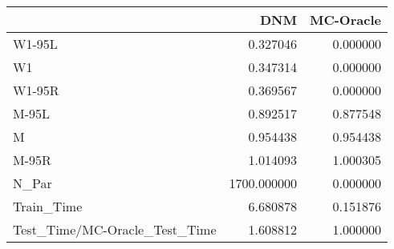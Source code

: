 \begin{tabular}{lrr}
\toprule
{} &          DNM &  MC-Oracle \\
\midrule
W1-95L                        &     0.327046 &   0.000000 \\
W1                            &     0.347314 &   0.000000 \\
W1-95R                        &     0.369567 &   0.000000 \\
M-95L                         &     0.892517 &   0.877548 \\
M                             &     0.954438 &   0.954438 \\
M-95R                         &     1.014093 &   1.000305 \\
N\_Par                         &  1700.000000 &   0.000000 \\
Train\_Time                    &     6.680878 &   0.151876 \\
Test\_Time/MC-Oracle\_Test\_Time &     1.608812 &   1.000000 \\
\bottomrule
\end{tabular}
